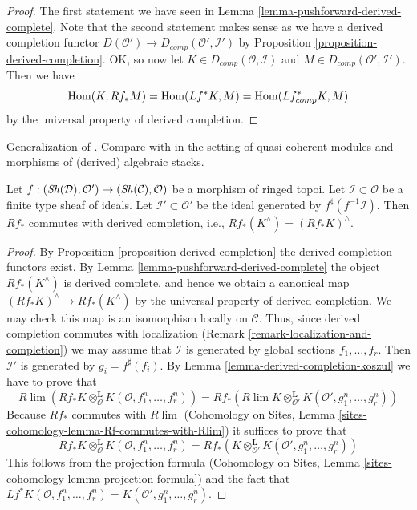 \begin{proof}
The first statement we have seen in
Lemma \ref{lemma-pushforward-derived-complete}.
Note that the second statement makes sense as we have a derived
completion functor $D(\mathcal{O}') \to D_{comp}(\mathcal{O}', \mathcal{I}')$
by Proposition \ref{proposition-derived-completion}.
OK, so now let $K \in D_{comp}(\mathcal{O}, \mathcal{I})$
and $M \in D_{comp}(\mathcal{O}', \mathcal{I}')$. Then we have
$$
\mathop{\mathrm{Hom}}\nolimits(K, Rf_*M) = \mathop{\mathrm{Hom}}\nolimits(Lf^*K, M) = \mathop{\mathrm{Hom}}\nolimits(Lf_{comp}^*K, M)
$$
by the universal property of derived completion.
\end{proof}

\begin{lemma}
\label{lemma-pushforward-commutes-with-derived-completion}
\begin{reference}
Generalization of \cite[Lemma 6.5.9 (2)]{BS}. Compare with
\cite[Theorem 6.5]{HL-P} in the setting of quasi-coherent modules
and morphisms of (derived) algebraic stacks.
\end{reference}
Let $f : (\mathop{\mathit{Sh}}\nolimits(\mathcal{D}), \mathcal{O}') \to (\mathop{\mathit{Sh}}\nolimits(\mathcal{C}), \mathcal{O})$
be a morphism of ringed topoi. Let $\mathcal{I} \subset \mathcal{O}$
be a finite type sheaf of ideals. Let $\mathcal{I}' \subset \mathcal{O}'$
be the ideal generated by $f^\sharp(f^{-1}\mathcal{I})$.
Then $Rf_*$ commutes with derived completion, i.e.,
$Rf_*(K^\wedge) = (Rf_*K)^\wedge$.
\end{lemma}

\begin{proof}
By Proposition \ref{proposition-derived-completion} the derived completion
functors exist. By Lemma \ref{lemma-pushforward-derived-complete} the object
$Rf_*(K^\wedge)$ is derived complete, and hence we obtain a canonical map
$(Rf_*K)^\wedge \to Rf_*(K^\wedge)$ by the universal property of derived
completion. We may check this map is an isomorphism locally on $\mathcal{C}$.
Thus, since derived completion commutes with localization
(Remark \ref{remark-localization-and-completion}) we may assume
that $\mathcal{I}$ is generated by global sections $f_1, \ldots, f_r$.
Then $\mathcal{I}'$ is generated by $g_i = f^\sharp(f_i)$. By
Lemma \ref{lemma-derived-completion-koszul}
we have to prove that
$$
R\lim \left(
Rf_*K \otimes^\mathbf{L}_\mathcal{O} K(\mathcal{O}, f_1^n, \ldots, f_r^n)
\right)
=
Rf_*\left(
R\lim
K \otimes^\mathbf{L}_{\mathcal{O}'} K(\mathcal{O}', g_1^n, \ldots, g_r^n)
\right)
$$
Because $Rf_*$ commutes with $R\lim$
(Cohomology on Sites, Lemma
\ref{sites-cohomology-lemma-Rf-commutes-with-Rlim})
it suffices to prove that
$$
Rf_*K \otimes^\mathbf{L}_\mathcal{O} K(\mathcal{O}, f_1^n, \ldots, f_r^n) =
Rf_*\left(
K \otimes^\mathbf{L}_{\mathcal{O}'} K(\mathcal{O}', g_1^n, \ldots, g_r^n)
\right)
$$
This follows from the projection formula (Cohomology on Sites, Lemma
\ref{sites-cohomology-lemma-projection-formula}) and the fact that
$Lf^*K(\mathcal{O}, f_1^n, \ldots, f_r^n) =
K(\mathcal{O}', g_1^n, \ldots, g_r^n)$.
\end{proof}


